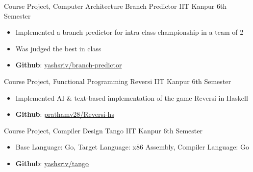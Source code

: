 \cventry
{Course Project, Computer Architecture}
{Branch Predictor}
{IIT Kanpur}
{6th Semester}
{
  \begin{itemize}
  \item Implemented a branch predictor for intra class championship in a team of 2
  \item Was judged the best in class
  \item \textbf{Github}:
    \href{http://github.com/yashsriv/branch-predictor}{yashsriv/branch-predictor} 
  \end{itemize}
}

\cventry
{Course Project, Functional Programming}
{Reversi}
{IIT Kanpur}
{6th Semester}
{
  \begin{itemize}
  \item Implemented AI \& text-based implementation of the game Reversi in Haskell
  \item \textbf{Github}:
    \href{https://github.com/prathamv28/Reversi-hs}{prathamv28/Reversi-hs} 
  \end{itemize}
}

\cventry
{Course Project, Compiler Design}
{Tango}
{IIT Kanpur}
{6th Semester}
{
  \begin{itemize}
  \item Base Language: Go, Target Language: x86 Assembly, Compiler Language: Go
  \item \textbf{Github}:
    \href{http://github.com/yashsriv/tango}{yashsriv/tango} 
  \end{itemize}
}